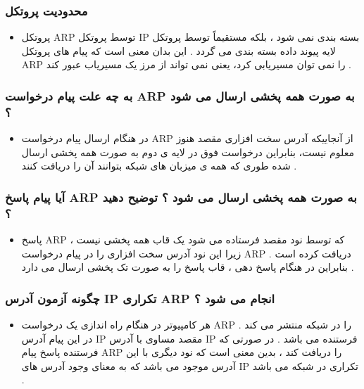 \documentclass[12pt]{book}
\begin{document}
\subsubsection{محدودیت پروتکل  }

\begin{itemize}
	\item پروتکل ARP
	توسط پروتکل IP بسته بندی نمی شود ، بلکه مستقیماً توسط پروتکل لایه پیوند داده بسته بندی می گردد . این بدان معنی است که پیام های پروتکل ARP را نمی توان مسیریابی کرد، یعنی نمی تواند از مرز یک مسیریاب عبور کند .
\end{itemize}



\subsubsection{
به چه علت پیام درخواست ARP به صورت همه پخشی ارسال می شود ؟
}

\begin{itemize}
	\item در هنگام ارسال پیام درخواست ARP
	از آنجاییکه آدرس سخت افزاری مقصد هنوز معلوم نیست، بنابراین درخواست فوق در لایه ی دوم به صورت همه پخشی ارسال شده طوری که همه ی میزبان های شبکه بتوانند آن را دریافت کنند .
\end{itemize}



\subsubsection{
 آیا پیام پاسخ ARP به صورت همه پخشی ارسال می شود ؟ توضیح دهید ؟
}


\begin{itemize}
	\item پاسخ ARP 
	که توسط نود مقصد فرستاده می شود یک قاب همه پخشی نیست ، زیرا این نود آدرس سخت افزاری را در پیام درخواست ARP دریافت کرده است . بنابراین در هنگام پاسخ دهی ، قاب پاسخ را به صورت تک پخشی ارسال می دارد .
\end{itemize}


\subsubsection{
 چگونه آزمون آدرس IP تکراری ARP انجام می شود ؟
}

\begin{itemize}
	\item هر کامپیوتر در هنگام راه اندازی یک درخواست ARP
	را در شبکه منتشر می کند . در این پیام آدرس IP مقصد مساوی با آدرس IP فرستنده می باشد .
	در صورتی که فرستنده پاسخ پیام ARP 
	را دریافت کند ، بدین معنی است که نود دیگری با این آدرس موجود می باشد که به معنای وجود آدرس های IP تکراری در شبکه می باشد .
\end{itemize}
\end{document}
